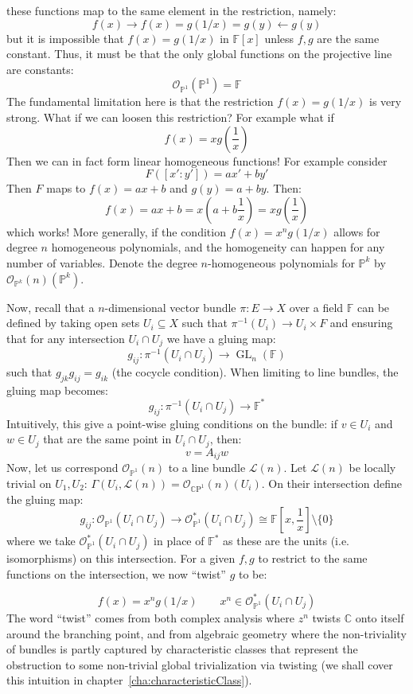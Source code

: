 \documentclass{ut-thesis}
\newcommand{\F}{{\mathbb{F}}}
\newcommand{\C}{{\mathbb{C}}}
\renewcommand{\P}{{\mathbb{P}}}
\newcommand{\CL}{{\mathcal{L}}}
\newcommand{\CO}{{\mathcal{O}}}
\newcommand{\CP}{{\mathbb{C}\mathrm{P}}}
\newcommand{\sse}{\subseteq}
\newcommand{\GL}{{\operatorname{GL}}}
\begin{document}
these functions map to the same element in the restriction, namely:
\[
  f(x) \to f(x) = g(1/x) = g(y) \leftarrow g(y)
\]
but it is impossible that $f(x) = g(1/x)$ in $\F[x]$ unless $f,g$ are the same constant. Thus, it must be that the only
global functions on the projective line are constants:
\[
  \CO_{\P^1}(\P^1) = \F
\]
The fundamental limitation here is that the restriction $f(x) = g(1/x)$ is very strong. What if we can loosen
this restriction? For example what if
\[
  f(x) = xg\left(\frac{1}{x}\right)
\]
Then we can in fact form linear homogeneous functions! For example consider
\[
  F([x':y']) = ax'+by'
\]
Then $F$ maps to $f(x) = ax+b$ and $g(y) = a + by$. Then:
\[
  f(x)= ax+b = x\left(a + b \frac{1}{x}\right)  = xg\left(\frac{1}{x}\right)
\]
which works! More generally, if the condition $f(x) = x^ng(1/x)$ allows for degree $n$ homogeneous
polynomials, and the homogeneity can happen for any number of variables. Denote the degree $n$-homogeneous
polynomials for $\P^k$ by $\CO_{\P^k}(n)(\P^k)$.

Now, recall that a $n$-dimensional vector bundle $\pi: E \to X$ over a field $\F$ can be defined by taking open
sets $U_i \sse X$ such that $\pi^{-1}(U_i) \to U_i\times F$ and ensuring that for any intersection $U_i\cap
U_j$ we have a gluing map:
\[
  g_{ij}: \pi^{-1}(U_i\cap U_j) \to \GL_n(\F)
\]
such that $g_{jk}g_{ij} = g_{ik}$ (the cocycle condition). When limiting
to line bundles, the gluing map becomes:
\[
  g_{ij}: \pi^{-1}(U_i\cap U_j) \to \F^*
\]
Intuitively, this give a point-wise gluing conditions on the bundle: if $v \in U_i$ and $w \in U_j$ that are
the same point in $U_i\cap U_j$, then:
\[
  v = A_{ij}w
\]
Now, let us correspond $\CO_{\P^1}(n)$ to a line bundle $\CL(n)$. Let $\CL(n)$ be
locally trivial on $U_1, U_2$: $\Gamma(U_i, \CL(n)) = \CO_{\CP^1}(n)(U_i)$. On their intersection define the gluing
map: \[ g_{ij}: \CO_{\P^1}(U_i\cap U_j) \to \CO_{\P^1}^*(U_i\cap U_j) \cong \F\left[x,
\frac{1}{x}\right]\setminus\{0\} \] where we take $\CO_{\P^1}^*(U_i\cap U_j)$ in place of $\F^*$ as these are
the units (i.e. isomorphisms) on this intersection. For a given $f,g$ to restrict to the same functions on
the intersection, we now ``twist'' $g$ to be:

\[
  f(x) = x^ng(1/x) \qquad x^n \in \CO_{\P^1}^*(U_i\cap U_j)
\]
The word ``twist'' comes from both complex analysis where $z^n$ twists $\C$ onto itself around the branching
point, and from algebraic geometry where the non-triviality of bundles is partly captured by characteristic
classes that represent the obstruction to some non-trivial global trivialization via twisting (we shall cover
this intuition in chapter~\ref{cha:characteristicClass}).
\end{document}

